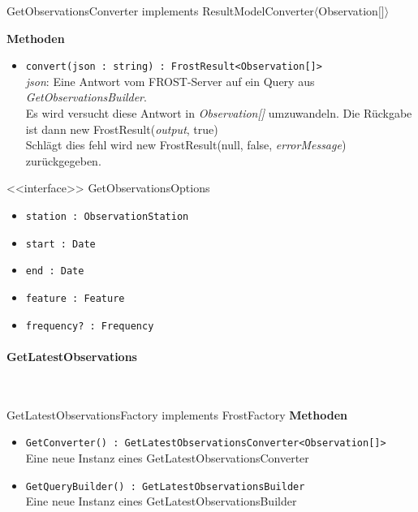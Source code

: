 \begin{Class}{GetObservationsConverter implements ResultModelConverter$\langle$Observation$\lbrack\rbrack\rangle$}

    \textbf{Methoden}
    \begin{itemize}
        \item \texttt{convert(json : string) : FrostResult<Observation[]>}
        \\ \emph{json}: Eine Antwort vom FROST-Server auf ein Query aus \emph{GetObservationsBuilder}.
        \\ Es wird versucht diese Antwort in \emph{Observation[]} umzuwandeln.
        Die Rückgabe ist dann new FrostResult(\emph{output}, true)
        \\ Schlägt dies fehl wird new FrostResult(null, false, \emph{errorMessage}) zurückgegeben.
    \end{itemize}
\end{Class}

\begin{Class}{<<interface>> GetObservationsOptions}
\begin{itemize}
    \item \texttt{station : ObservationStation}
    \item \texttt{start : Date}
    \item \texttt{end : Date}
    \item \texttt{feature : Feature}
    \item \texttt{frequency? : Frequency}
\end{itemize}
\end{Class}


\paragraph{GetLatestObservations}\mbox{}\\
\begin{Class}{GetLatestObservationsFactory implements FrostFactory}
    \textbf{Methoden}
    \begin{itemize}
        \item \texttt{GetConverter() : GetLatestObservationsConverter<Observation[]>}
        \\ Eine neue Instanz eines GetLatestObservationsConverter
        \item \texttt{GetQueryBuilder() : GetLatestObservationsBuilder}
        \\ Eine neue Instanz eines GetLatestObservationsBuilder
    \end{itemize}
\end{Class}

